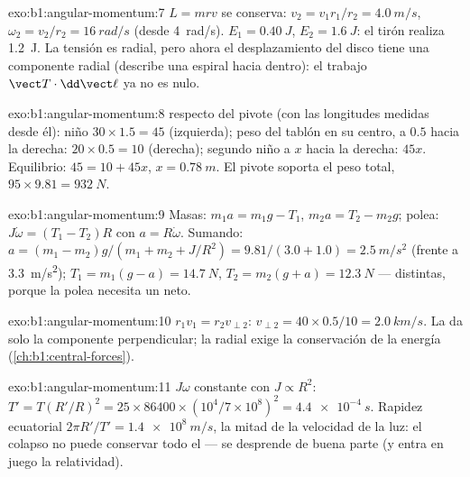 \begin{solution}{exo:b1:angular-momentum:7}
$L = mrv$ se conserva: $v_2 = v_1r_1/r_2 = \qty{4.0}{m/s}$, $\omega_2 = v_2/r_2
= \qty{16}{rad/s}$ (desde \qty{4}{rad/s}). $E_1 = \qty{0.40}{J}$, $E_2 =
\qty{1.6}{J}$: el tirón realiza \qty{1.2}{J}. La tensión es radial, pero
ahora el desplazamiento del disco tiene una componente radial (describe
una espiral hacia dentro): el trabajo $\vect T\cdot\dd\vect\ell$ ya no es nulo.
\end{solution}

\begin{solution}{exo:b1:angular-momentum:8}
 respecto del pivote (con las longitudes medidas desde él): niño
$30 \times 1.5 =
45$ (izquierda); peso del tablón en su centro, a $0.5$ hacia la derecha: $20 \times
0.5 = 10$ (derecha); segundo niño a $x$ hacia la derecha: $45x$.
Equilibrio: $45 = 10 + 45x$, $x = \qty{0.78}{m}$. El pivote soporta el
peso total, $95 \times 9.81 = \qty{932}{N}$.
\end{solution}

\begin{solution}{exo:b1:angular-momentum:9}
Masas: $m_1a = m_1g - T_1$, $m_2a = T_2 - m_2g$; polea: $J\dot\omega =
(T_1 - T_2)R$ con $a = R\dot\omega$. Sumando: $a = (m_1 - m_2)g/(m_1 + m_2 +
J/R^2) = 9.81/(3.0 + 1.0) = \qty{2.5}{m/s^2}$ (frente a \qty{3.3}{m/s^2});
$T_1 = m_1(g - a) = \qty{14.7}{N}$, $T_2 = m_2(g + a) = \qty{12.3}{N}$ ---
distintas, porque la polea necesita un  neto.
\end{solution}

\begin{solution}{exo:b1:angular-momentum:10}
$r_1v_1 = r_2v_{\perp 2}$: $v_{\perp 2} = 40 \times 0.5/10 = \qty{2.0}{km/s}$.
La  da solo la componente perpendicular; la radial exige
la conservación de la energía (\cref{ch:b1:central-forces}).
\end{solution}

\begin{solution}{exo:b1:angular-momentum:11}
$J\omega$ constante con $J \propto R^2$: $T' = T(R'/R)^2 = 25 \times 86400
\times (10^4/7\times10^8)^2 = \qty{4.4e-4}{s}$. Rapidez ecuatorial $2\pi R'/T'
= \qty{1.4e8}{m/s}$, la mitad de la velocidad de la luz: el colapso no
puede conservar todo el  --- se desprende de buena parte
(y entra en juego la relatividad).
\end{solution}

